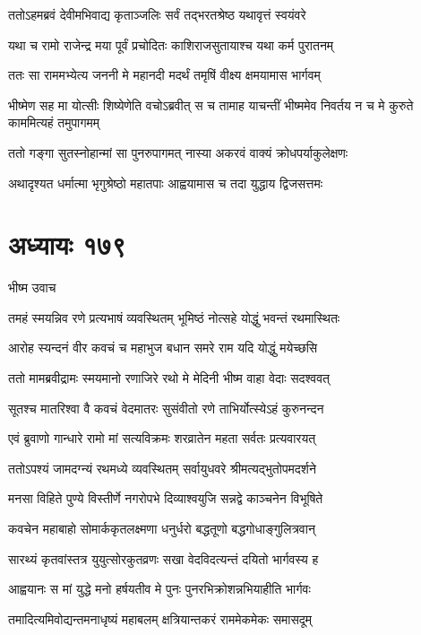 \twolineshloka
{ततोऽहमब्रवं देवीमभिवाद्य कृताञ्जलिः}
{सर्वं तद्भरतश्रेष्ठ यथावृत्तं स्वयंवरे}


\twolineshloka
{यथा च रामो राजेन्द्र मया पूर्वं प्रचोदितः}
{काशिराजसुतायाश्च यथा कर्म पुरातनम्}


\twolineshloka
{ततः सा राममभ्येत्य जननी मे महानदी}
{मदर्थं तमृषिं वीक्ष्य क्षमयामास भार्गवम्}


\threelineshloka
{भीष्मेण सह मा योत्सीः शिष्येणेति वचोऽब्रवीत्}
{स च तामाह याचन्तीं भीष्ममेव निवर्तय}
{न च मे कुरुते काममित्यहं तमुपागमम्}


\twolineshloka
{ततो गङ्गा सुतस्नोहान्मां सा पुनरुपागमत्}
{नास्या अकरवं वाक्यं क्रोधपर्याकुलेक्षणः}


\twolineshloka
{अथादृश्यत धर्मात्मा भृगुश्रेष्ठो महातपाः}
{आह्वयामास च तदा युद्धाय द्विजसत्तमः}


\chapter{अध्यायः १७९}
\twolineshloka
{भीष्म उवाच}
{}


\twolineshloka
{तमहं स्मयन्निव रणे प्रत्यभाषं व्यवस्थितम्}
{भूमिष्ठं नोत्सहे योद्धुं भवन्तं रथमास्थितः}


\twolineshloka
{आरोह स्यन्दनं वीर कवचं च महाभुज}
{बधान समरे राम यदि योद्धुं मयेच्छसि}


\twolineshloka
{ततो मामब्रवीद्रामः स्मयमानो रणाजिरे}
{रथो मे मेदिनी भीष्म वाहा वेदाः सदश्ववत्}


\twolineshloka
{सूतश्च मातरिश्वा वै कवचं वेदमातरः}
{सुसंवीतो रणे ताभिर्योत्स्येऽहं कुरुनन्दन}


\twolineshloka
{एवं ब्रुवाणो गान्धारे रामो मां सत्यविक्रमः}
{शरव्रातेन महता सर्वतः प्रत्यवारयत्}


\twolineshloka
{ततोऽपश्यं जामदग्न्यं रथमध्ये व्यवस्थितम्}
{सर्वायुधवरे श्रीमत्यद्भुतोपमदर्शने}


\twolineshloka
{मनसा विहिते पुण्ये विस्तीर्णे नगरोपभे}
{दिव्याश्वयुजि सन्नद्वे काञ्चनेन विभूषिते}


\twolineshloka
{कवचेन महाबाहो सोमार्ककृतलक्ष्मणा}
{धनुर्धरो बद्धतूणो बद्धगोधाङ्गुलित्रवान्}


\twolineshloka
{सारथ्यं कृतवांस्तत्र युयुत्सोरकुतव्रणः}
{सखा वेदविदत्यन्तं दयितो भार्गवस्य ह}


\twolineshloka
{आह्वयानः स मां युद्धे मनो हर्षयतीव मे}
{पुनः पुनरभिक्रोशन्नभियाहीति भार्गवः}


\twolineshloka
{तमादित्यमिवोद्यन्तमनाधृष्यं महाबलम्}
{क्षत्रियान्तकरं राममेकमेकः समासदूम्}


